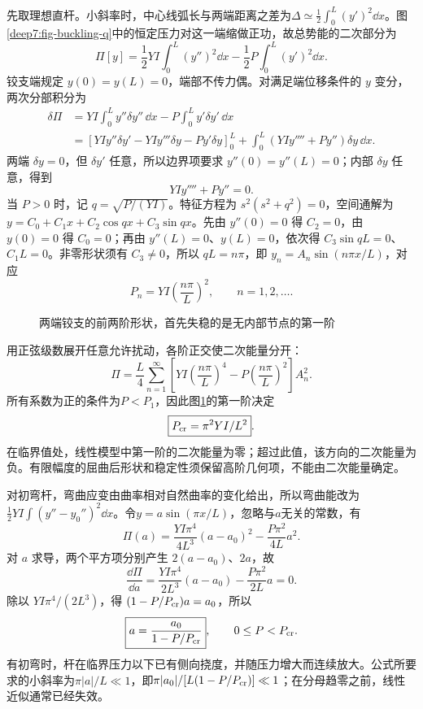 \begin{solution}
先取理想直杆。小斜率时，中心线弧长与两端距离之差为$\Delta\simeq\tfrac12\int_0^L(y')^2\dd x$。图\ref{deep7:fig-buckling-q}中的恒定压力对这一端缩做正功，故总势能的二次部分为
\[
 \Pi[y]=\frac12YI\int_0^L(y'')^2\dd x
 -\frac12P\int_0^L(y')^2\dd x.
\]
铰支端规定 $y(0)=y(L)=0$，端部不传力偶。对满足端位移条件的 $y$ 变分，两次分部积分为
\[
\begin{aligned}
\delta\Pi&=YI\int_0^Ly''\delta y''\,\dd x-P\int_0^Ly'\delta y'\,\dd x\\
&=[YIy''\delta y'-YIy'''\delta y-Py'\delta y]_0^L
+\int_0^L(YIy''''+Py'')\delta y\,\dd x.
\end{aligned}
\]
两端 $\delta y=0$，但 $\delta y'$ 任意，所以边界项要求 $y''(0)=y''(L)=0$；内部 $\delta y$ 任意，得到
\[
 YI y''''+Py''=0.
\]
当 $P>0$ 时，记 $q=\sqrt{P/(YI)}$。特征方程为 $s^2(s^2+q^2)=0$，空间通解为 $y=C_0+C_1x+C_2\cos qx+C_3\sin qx$。先由 $y''(0)=0$ 得 $C_2=0$，由 $y(0)=0$ 得 $C_0=0$；再由 $y''(L)=0$、$y(L)=0$，依次得 $C_3\sin qL=0$、$C_1L=0$。非零形状须有 $C_3\ne0$，所以 $qL=n\pi$，即 $y_n=A_n\sin(n\pi x/L)$，对应
\[
 P_n=YI\left(\frac{n\pi}L\right)^2,\qquad n=1,2,\ldots.
\]
\begin{figure}[H]\centering
{}
\caption{两端铰支的前两阶形状，首先失稳的是无内部节点的第一阶}\label{deep7:fig-buckling-s}
\end{figure}
用正弦级数展开任意允许扰动，各阶正交使二次能量分开：
\[
 \Pi=\frac L4\sum_{n=1}^{\infty}
 \left[YI\left(\frac{n\pi}L\right)^4
 -P\left(\frac{n\pi}L\right)^2\right]A_n^2.
\]
所有系数为正的条件为$P<P_1$，因此图\ref{deep7:fig-buckling-s}的第一阶决定
\[
 \boxed{P_{\rm cr}=\pi^2YI/L^2}.
\]
在临界值处，线性模型中第一阶的二次能量为零；超过此值，该方向的二次能量为负。有限幅度的屈曲后形状和稳定性须保留高阶几何项，不能由二次能量确定。

对初弯杆，弯曲应变由曲率相对自然曲率的变化给出，所以弯曲能改为$\tfrac12YI\int(y''-y_0'')^2\dd x$。令$y=a\sin(\pi x/L)$，忽略与$a$无关的常数，有
\[
 \Pi(a)=\frac{YI\pi^4}{4L^3}(a-a_0)^2
 -\frac{P\pi^2}{4L}a^2.
\]
对 $a$ 求导，两个平方项分别产生 $2(a-a_0)$、$2a$，故
\[
\frac{\dd\Pi}{\dd a}=\frac{YI\pi^4}{2L^3}(a-a_0)-\frac{P\pi^2}{2L}a=0.
\]
除以 $YI\pi^4/(2L^3)$，得 $(1-P/P_{\rm cr})a=a_0$，所以
\[
 \boxed{a=\frac{a_0}{1-P/P_{\rm cr}}},\qquad 0\le P<P_{\rm cr}.
\]
有初弯时，杆在临界压力以下已有侧向挠度，并随压力增大而连续放大。公式所要求的小斜率为$\pi|a|/L\ll1$，即$\pi|a_0|/[L(1-P/P_{\rm cr})]\ll1$；在分母趋零之前，线性近似通常已经失效。
\end{solution}


